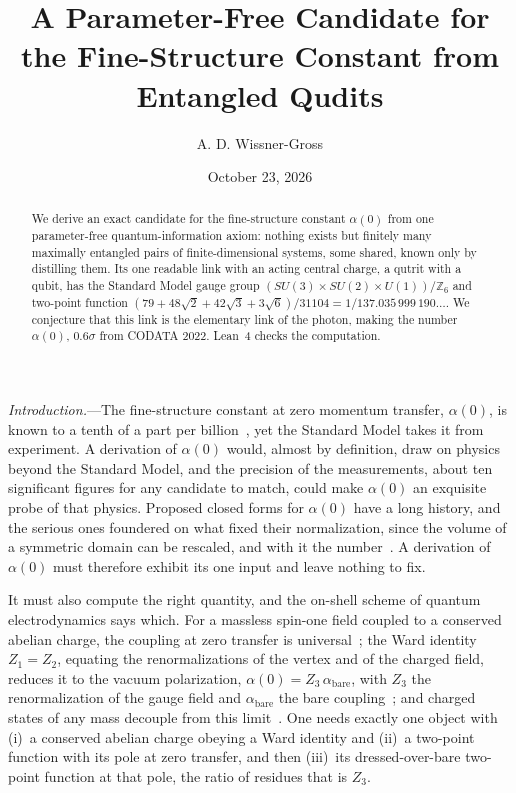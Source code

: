 \documentclass[aps,prl,reprint,superscriptaddress,longbibliography,nofootinbib,floatfix]{revtex4-2}
\theoremstyle{definition}
\begin{document}
\title{A Parameter-Free Candidate for the Fine-Structure Constant from Entangled Qudits}

\author{A. D. Wissner-Gross}
\noaffiliation
\date{October 23, 2026}

\begin{abstract}
We derive an exact candidate for the fine-structure constant $\alpha(0)$ from one parameter-free quantum-information axiom: nothing exists but finitely many maximally entangled pairs of finite-dimensional systems, some shared, known only by distilling them. Its one readable link with an acting central charge, a qutrit with a qubit, has the Standard Model gauge group $(SU(3)\times SU(2)\times U(1))/\mathbb{Z}_{6}$ and two-point function $(79+48\sqrt{2}+42\sqrt{3}+3\sqrt{6})/31104=1/137.035\,999\,190\ldots$. We conjecture that this link is the elementary link of the photon, making the number $\alpha(0)$, $0.6\sigma$ from CODATA 2022. Lean~4 checks the computation.
\end{abstract}

\maketitle

\emph{Introduction.}---The fine-structure constant at zero momentum transfer, $\alpha(0)$, is known to a tenth of a part per billion~\cite{fan2023,morel2020,parker2018,codata2022}, yet the Standard Model takes it from experiment. A derivation of $\alpha(0)$ would, almost by definition, draw on physics beyond the Standard Model, and the precision of the measurements, about ten significant figures for any candidate to match, could make $\alpha(0)$ an exquisite probe of that physics. Proposed closed forms for $\alpha(0)$ have a long history, and the serious ones foundered on what fixed their normalization, since the volume of a symmetric domain can be rescaled, and with it the number~\cite{wyler1969,wyler1971,robertson1971,gilmore1972}. A derivation of $\alpha(0)$ must therefore exhibit its one input and leave nothing to fix.

It must also compute the right quantity, and the on-shell scheme of quantum electrodynamics says which. For a massless spin-one field coupled to a conserved abelian charge, the coupling at zero transfer is universal~\cite{weinberg1964,weinberg1965}; the Ward identity $Z_{1}=Z_{2}$, equating the renormalizations of the vertex and of the charged field, reduces it to the vacuum polarization, $\alpha(0)=Z_{3}\,\alpha_{\mathrm{bare}}$, with $Z_{3}$ the renormalization of the gauge field and $\alpha_{\mathrm{bare}}$ the bare coupling~\cite{peskin1995}; and charged states of any mass decouple from this limit~\cite{appelquist1975}. One needs exactly one object with (i)~a conserved abelian charge obeying a Ward identity and (ii)~a two-point function with its pole at zero transfer, and then (iii)~its dressed-over-bare two-point function at that pole, the ratio of residues that is $Z_{3}$.
\end{document}
